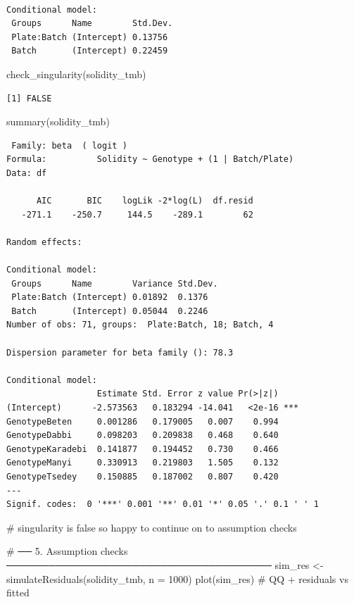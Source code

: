 \documentclass[
  letterpaper,
  DIV=11,
  numbers=noendperiod]{scrartcl}
\newenvironment{Shaded}{\begin{snugshade}}{\end{snugshade}}
\newcommand{\AttributeTok}[1]{\textcolor[rgb]{0.40,0.45,0.13}{#1}}
\newcommand{\CommentTok}[1]{\textcolor[rgb]{0.37,0.37,0.37}{#1}}
\newcommand{\DecValTok}[1]{\textcolor[rgb]{0.68,0.00,0.00}{#1}}
\newcommand{\FunctionTok}[1]{\textcolor[rgb]{0.28,0.35,0.67}{#1}}
\newcommand{\NormalTok}[1]{\textcolor[rgb]{0.00,0.23,0.31}{#1}}
\newcommand{\OtherTok}[1]{\textcolor[rgb]{0.00,0.23,0.31}{#1}}
\begin{document}
\begin{verbatim}

Conditional model:
 Groups      Name        Std.Dev.
 Plate:Batch (Intercept) 0.13756 
 Batch       (Intercept) 0.22459 
\end{verbatim}

\begin{Shaded}
\begin{Highlighting}[]
\FunctionTok{check\_singularity}\NormalTok{(solidity\_tmb)}
\end{Highlighting}
\end{Shaded}

\begin{verbatim}
[1] FALSE
\end{verbatim}

\begin{Shaded}
\begin{Highlighting}[]
\FunctionTok{summary}\NormalTok{(solidity\_tmb)}
\end{Highlighting}
\end{Shaded}

\begin{verbatim}
 Family: beta  ( logit )
Formula:          Solidity ~ Genotype + (1 | Batch/Plate)
Data: df

      AIC       BIC    logLik -2*log(L)  df.resid 
   -271.1    -250.7     144.5    -289.1        62 

Random effects:

Conditional model:
 Groups      Name        Variance Std.Dev.
 Plate:Batch (Intercept) 0.01892  0.1376  
 Batch       (Intercept) 0.05044  0.2246  
Number of obs: 71, groups:  Plate:Batch, 18; Batch, 4

Dispersion parameter for beta family (): 78.3 

Conditional model:
                  Estimate Std. Error z value Pr(>|z|)    
(Intercept)      -2.573563   0.183294 -14.041   <2e-16 ***
GenotypeBeten     0.001286   0.179005   0.007    0.994    
GenotypeDabbi     0.098203   0.209838   0.468    0.640    
GenotypeKaradebi  0.141877   0.194452   0.730    0.466    
GenotypeManyi     0.330913   0.219803   1.505    0.132    
GenotypeTsedey    0.150885   0.187002   0.807    0.420    
---
Signif. codes:  0 '***' 0.001 '**' 0.01 '*' 0.05 '.' 0.1 ' ' 1
\end{verbatim}

\begin{Shaded}
\begin{Highlighting}[]
\CommentTok{\# singularity is false so happy to continue on to assumption checks}

\CommentTok{\# ── 5. Assumption checks ──────────────────────────────────────}
\NormalTok{sim\_res }\OtherTok{\textless{}{-}} \FunctionTok{simulateResiduals}\NormalTok{(solidity\_tmb, }\AttributeTok{n =} \DecValTok{1000}\NormalTok{)}
\FunctionTok{plot}\NormalTok{(sim\_res)                               }\CommentTok{\# QQ + residuals vs fitted}
\end{Highlighting}
\end{Shaded}
\end{document}
